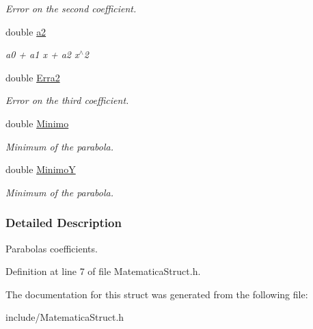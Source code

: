 \begin{DoxyCompactItemize}
\begin{DoxyCompactList}\small\item\em \-Error on the second coefficient. \end{DoxyCompactList}\item 
\hypertarget{structPARABOLA_ac55c2d269ed76bd9bdb7fb25f3533a4e}{double \hyperlink{structPARABOLA_ac55c2d269ed76bd9bdb7fb25f3533a4e}{a2}}\label{structPARABOLA_ac55c2d269ed76bd9bdb7fb25f3533a4e}

\begin{DoxyCompactList}\small\item\em a0 + a1 x + a2 x$^\wedge$2 \end{DoxyCompactList}\item 
\hypertarget{structPARABOLA_a18371909b4059cce673620670d516e01}{double \hyperlink{structPARABOLA_a18371909b4059cce673620670d516e01}{\-Erra2}}\label{structPARABOLA_a18371909b4059cce673620670d516e01}

\begin{DoxyCompactList}\small\item\em \-Error on the third coefficient. \end{DoxyCompactList}\item 
\hypertarget{structPARABOLA_a09d69325016439f54c434a28a71bf666}{double \hyperlink{structPARABOLA_a09d69325016439f54c434a28a71bf666}{\-Minimo}}\label{structPARABOLA_a09d69325016439f54c434a28a71bf666}

\begin{DoxyCompactList}\small\item\em \-Minimum of the parabola. \end{DoxyCompactList}\item 
\hypertarget{structPARABOLA_abbfab7a69ef1371aef5bf3cefa0abaa9}{double \hyperlink{structPARABOLA_abbfab7a69ef1371aef5bf3cefa0abaa9}{\-Minimo\-Y}}\label{structPARABOLA_abbfab7a69ef1371aef5bf3cefa0abaa9}

\begin{DoxyCompactList}\small\item\em \-Minimum of the parabola. \end{DoxyCompactList}\end{DoxyCompactItemize}


\subsubsection{\-Detailed \-Description}
\-Parabolas coefficients. 

\-Definition at line 7 of file \-Matematica\-Struct.\-h.



\-The documentation for this struct was generated from the following file\-:\begin{DoxyCompactItemize}
\item 
include/\-Matematica\-Struct.\-h\end{DoxyCompactItemize}
